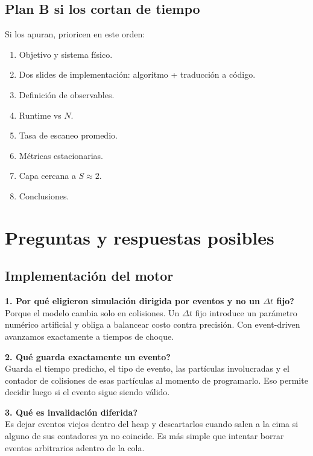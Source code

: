 \documentclass[11pt]{article}
\begin{document}
\subsection{Plan B si los cortan de tiempo}

Si los apuran, prioricen en este orden:

\begin{enumerate}
  \item Objetivo y sistema f\'isico.
  \item Dos slides de implementaci\'on: algoritmo + traducci\'on a c\'odigo.
  \item Definici\'on de observables.
  \item Runtime vs $N$.
  \item Tasa de escaneo promedio.
  \item M\'etricas estacionarias.
  \item Capa cercana a $S \approx 2$.
  \item Conclusiones.
\end{enumerate}

\section{Preguntas y respuestas posibles}
\label{sec:preguntas}

\subsection{Implementaci\'on del motor}

\textbf{1. \textquestiondown Por qu\'e eligieron simulaci\'on dirigida por eventos y no un $\Delta t$ fijo?}\\
Porque el modelo cambia solo en colisiones. Un $\Delta t$ fijo introduce un par\'ametro num\'erico artificial y obliga a balancear costo contra precisi\'on. Con event-driven avanzamos exactamente a tiempos de choque.

\textbf{2. \textquestiondown Qu\'e guarda exactamente un evento?}\\
Guarda el tiempo predicho, el tipo de evento, las part\'iculas involucradas y el contador de colisiones de esas part\'iculas al momento de programarlo. Eso permite decidir luego si el evento sigue siendo v\'alido.

\textbf{3. \textquestiondown Qu\'e es invalidaci\'on diferida?}\\
Es dejar eventos viejos dentro del heap y descartarlos cuando salen a la cima si alguno de sus contadores ya no coincide. Es m\'as simple que intentar borrar eventos arbitrarios adentro de la cola.
\end{document}
